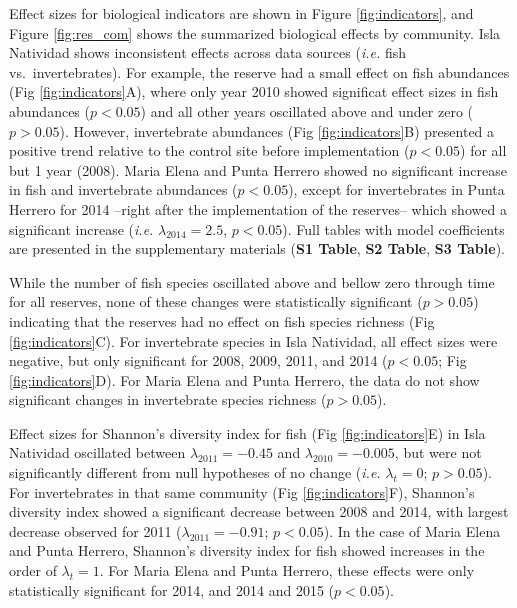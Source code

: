 \documentclass{frontiersSCNS}
\theoremstyle{definition}
\theoremstyle{definition}
\theoremstyle{definition}
\theoremstyle{remark}
\begin{document}
Effect sizes for biological indicators are shown in Figure
\ref{fig:indicators}, and Figure \ref{fig:res_com} shows the summarized
biological effects by community. Isla Natividad shows inconsistent
effects across data sources (\emph{i.e.} fish vs.~invertebrates). For
example, the reserve had a small effect on fish abundances (Fig
\ref{fig:indicators}A), where only year 2010 showed significat effect
sizes in fish abundances (\(p<0.05\)) and all other years oscillated
above and under zero (\(p > 0.05\)). However, invertebrate abundances
(Fig \ref{fig:indicators}B) presented a positive trend relative to the
control site before implementation (\(p < 0.05\)) for all but 1 year
(2008). Maria Elena and Punta Herrero showed no significant increase in
fish and invertebrate abundances (\(p< 0.05\)), except for invertebrates
in Punta Herrero for 2014 --right after the implementation of the
reserves-- which showed a significant increase (\emph{i.e.}
\(\lambda_{2014} = 2.5\), \(p < 0.05\)). Full tables with model
coefficients are presented in the supplementary materials (\textbf{S1
Table}, \textbf{S2 Table}, \textbf{S3 Table}).

While the number of fish species oscillated above and bellow zero
through time for all reserves, none of these changes were statistically
significant (\(p > 0.05\)) indicating that the reserves had no effect on
fish species richness (Fig \ref{fig:indicators}C). For invertebrate
species in Isla Natividad, all effect sizes were negative, but only
significant for 2008, 2009, 2011, and 2014 (\(p < 0.05\); Fig
\ref{fig:indicators}D). For Maria Elena and Punta Herrero, the data do
not show significant changes in invertebrate species richness
(\(p > 0.05\)).

Effect sizes for Shannon's diversity index for fish (Fig
\ref{fig:indicators}E) in Isla Natividad oscillated between
\(\lambda_{2011} = -0.45\) and \(\lambda_{2010} = -0.005\), but were not
significantly different from null hypotheses of no change (\emph{i.e.}
\(\lambda_t = 0\); \(p > 0.05\)). For invertebrates in that same
community (Fig \ref{fig:indicators}F), Shannon's diversity index showed
a significant decrease between 2008 and 2014, with largest decrease
observed for 2011 (\(\lambda_{2011} = -0.91\); \(p < 0.05\)). In the
case of Maria Elena and Punta Herrero, Shannon's diversity index for
fish showed increases in the order of \(\lambda_t = 1\). For Maria Elena
and Punta Herrero, these effects were only statistically significant for
2014, and 2014 and 2015 (\(p < 0.05\)).
\end{document}
